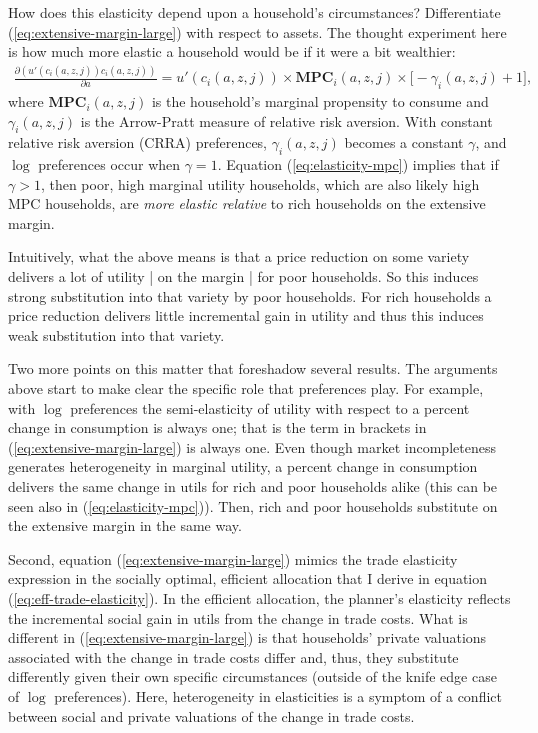\documentclass[12pt,pdftex]{article}
\begin{document}
\begin{onehalfspacing}
How does this elasticity depend upon a household's circumstances? Differentiate (\ref{eq:extensive-margin-large}) with respect to assets. The thought experiment here is how much more elastic a household would be if it were a bit wealthier:
\begin{align}
\frac{\partial (u'(c_{i}(a,z,j))c_{i}(a,z,j))}{\partial a} = u'(c_{i}(a,z,j))\times \mathbf{MPC}_{i}(a,z,j) \times \bigg[-\gamma_{i}(a,z,j) + 1\bigg], \label{eq:elasticity-mpc}
\end{align}
where $\mathbf{MPC}_{i}(a,z,j)$ is the household's marginal propensity to consume and $\gamma_{i}(a,z,j)$ is the Arrow-Pratt measure of relative risk aversion. With constant relative risk aversion (CRRA) preferences, $\gamma_{i}(a,z,j)$ becomes a constant $\gamma$, and $\log$ preferences occur when $\gamma = 1$. Equation (\ref{eq:elasticity-mpc}) implies that if $\gamma > 1$, then poor, high marginal utility households, which are also likely high MPC households, are \emph{more elastic relative} to rich households on the extensive margin.

Intuitively, what the above means is that a price reduction on some variety delivers a lot of utility | on the margin | for poor households. So this induces strong substitution into that variety by poor households. For rich households a price reduction delivers little incremental gain in utility and thus this induces weak substitution into that variety.

Two more points on this matter that foreshadow several results. The arguments above start to make clear the specific role that preferences play. For example, with $\log$ preferences the semi-elasticity of utility with respect to a percent change in consumption is always one; that is the term in brackets in (\ref{eq:extensive-margin-large}) is always one. Even though market incompleteness generates heterogeneity in marginal utility, a percent change in consumption delivers the same change in utils for rich and poor households alike (this can be seen also in (\ref{eq:elasticity-mpc})). Then, rich and poor households substitute on the extensive margin in the same way.

Second, equation (\ref{eq:extensive-margin-large})  mimics the trade elasticity expression in the socially optimal, efficient allocation that I derive in equation (\ref{eq:eff-trade-elasticity}). In the efficient allocation, the planner's elasticity reflects the incremental social gain in utils from the change in trade costs. What is different in (\ref{eq:extensive-margin-large}) is that households' private valuations associated with the change in trade costs differ and, thus, they substitute differently given their own specific circumstances (outside of the knife edge case of $\log$ preferences).  Here, heterogeneity in elasticities is a symptom of a conflict between social and private valuations of the change in trade costs.


\end{onehalfspacing}
\end{document}
